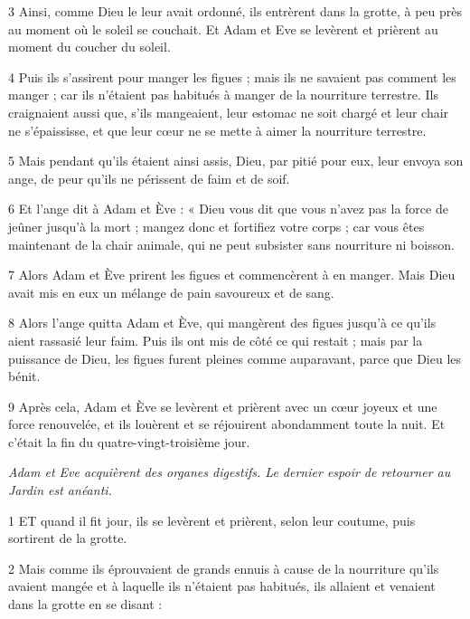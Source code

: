 \par 3 Ainsi, comme Dieu le leur avait ordonné, ils entrèrent dans la grotte, à peu près au moment où le soleil se couchait. Et Adam et Eve se levèrent et prièrent au moment du coucher du soleil.

\par 4 Puis ils s'assirent pour manger les figues ; mais ils ne savaient pas comment les manger ; car ils n'étaient pas habitués à manger de la nourriture terrestre. Ils craignaient aussi que, s'ils mangeaient, leur estomac ne soit chargé et leur chair ne s'épaississe, et que leur cœur ne se mette à aimer la nourriture terrestre.

\par 5 Mais pendant qu'ils étaient ainsi assis, Dieu, par pitié pour eux, leur envoya son ange, de peur qu'ils ne périssent de faim et de soif.

\par 6 Et l'ange dit à Adam et Ève : « Dieu vous dit que vous n'avez pas la force de jeûner jusqu'à la mort ; mangez donc et fortifiez votre corps ; car vous êtes maintenant de la chair animale, qui ne peut subsister sans nourriture ni boisson.

\par 7 Alors Adam et Ève prirent les figues et commencèrent à en manger. Mais Dieu avait mis en eux un mélange de pain savoureux et de sang.

\par 8 Alors l'ange quitta Adam et Ève, qui mangèrent des figues jusqu'à ce qu'ils aient rassasié leur faim. Puis ils ont mis de côté ce qui restait ; mais par la puissance de Dieu, les figues furent pleines comme auparavant, parce que Dieu les bénit.

\par 9 Après cela, Adam et Ève se levèrent et prièrent avec un cœur joyeux et une force renouvelée, et ils louèrent et se réjouirent abondamment toute la nuit. Et c'était la fin du quatre-vingt-troisième jour.


\par \textit{Adam et Eve acquièrent des organes digestifs. Le dernier espoir de retourner au Jardin est anéanti.}

\par 1 ET quand il fit jour, ils se levèrent et prièrent, selon leur coutume, puis sortirent de la grotte.

\par 2 Mais comme ils éprouvaient de grands ennuis à cause de la nourriture qu'ils avaient mangée et à laquelle ils n'étaient pas habitués, ils allaient et venaient dans la grotte en se disant :


